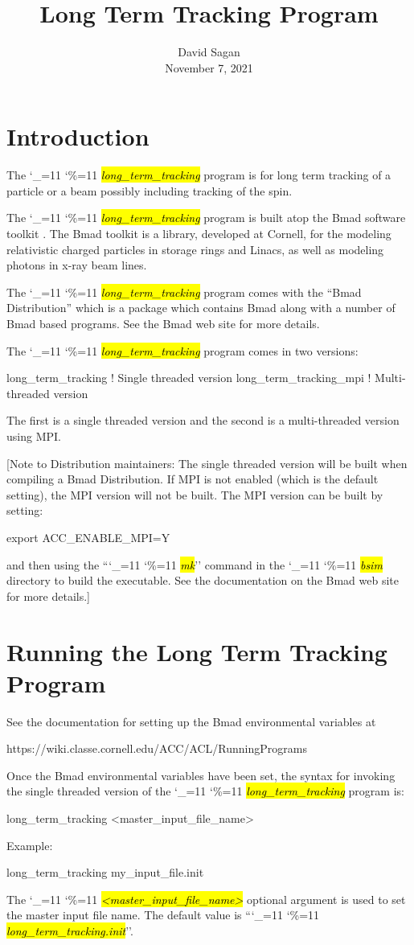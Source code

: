 \documentclass{hitec}
\title{Long Term Tracking Program}
\author{}
\date{David Sagan \\ November 7, 2021}
\newcommand\dottcmd[1]{\hl{\em#1}\endgroup}
\newcommand{\vn}{\begingroup\catcode`\_=11 \catcode`\%=11 \dottcmd}
\newcommand{\ltt}{\vn{long_term_tracking}\xspace}
\newcommand{\Section}[1]{\section{#1}\vspace*{-1ex}}
\begin{document}
\maketitle

\tableofcontents


\Section{Introduction} 
\label{s:intro}

The \ltt program is for long term tracking of a particle or a beam possibly including tracking of the
spin.

The \ltt program is built atop the Bmad software toolkit \cite{b:bmad}. The Bmad toolkit is a
library, developed at Cornell, for the modeling relativistic charged particles in storage rings and
Linacs, as well as modeling photons in x-ray beam lines.

The \ltt program comes with the ``Bmad Distribution'' which is a package which contains Bmad along with
a number of Bmad based programs. See the Bmad web site for more details.

The \ltt program comes in two versions: 
\begin{code}
long_term_tracking      ! Single threaded version
long_term_tracking_mpi  ! Multi-threaded version
\end{code}
The first is a single threaded version and the second is a multi-threaded version using MPI.

[Note to Distribution maintainers: The single threaded version will be built when compiling a Bmad
Distribution. If MPI is not enabled (which is the default setting), the MPI version will not be built. 
The MPI version can be built by setting:
\begin{code}
  export ACC_ENABLE_MPI=Y
\end{code}
and then using the ``\vn{mk}'' command in the \vn{bsim} directory to build the executable. See the
documentation on the Bmad web site for more details.]

\Section{Running the Long Term Tracking Program} 
\label{s:run}

See the documentation for setting up the Bmad environmental variables at
\begin{code}
  https://wiki.classe.cornell.edu/ACC/ACL/RunningPrograms
\end{code}

Once the Bmad environmental variables have been set, the syntax for invoking the single threaded
version of the \ltt program is:
\begin{code}
  long_term_tracking {<master_input_file_name>}
\end{code}
Example:
\begin{code}
  long_term_tracking my_input_file.init
\end{code}
The \vn{<master_input_file_name>} optional argument is used to set the master input file name. The
default value is ``\vn{long_term_tracking.init}''. 
\end{document}
